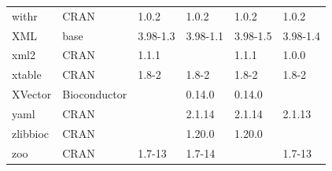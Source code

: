 \begin{longtable}{llllll}
\rowcolor{black!5}
withr                         & CRAN                      & 1.0.2       & 1.0.2       & 1.0.2          & 1.0.2              \\
\rowcolor{black!10}
XML                           & base                      & 3.98-1.3    & 3.98-1.1    & 3.98-1.5       & 3.98-1.4          \\
\rowcolor{black!5}
xml2                          & CRAN                      & 1.1.1       &             & 1.1.1          & 1.0.0              \\
\rowcolor{black!10}
xtable                        & CRAN                      & 1.8-2       & 1.8-2       & 1.8-2          & 1.8-2             \\
\rowcolor{black!5}
XVector                       & Bioconductor              &             & 0.14.0      & 0.14.0         &                    \\
\rowcolor{black!10}
yaml                          & CRAN                      &             & 2.1.14      & 2.1.14         & 2.1.13            \\
\rowcolor{black!5}
zlibbioc                      & CRAN                      &             & 1.20.0      & 1.20.0         &                    \\
\rowcolor{black!10}
zoo                           & CRAN                      & 1.7-13      & 1.7-14      &                & 1.7-13            \\
\hline
\end{longtable}
